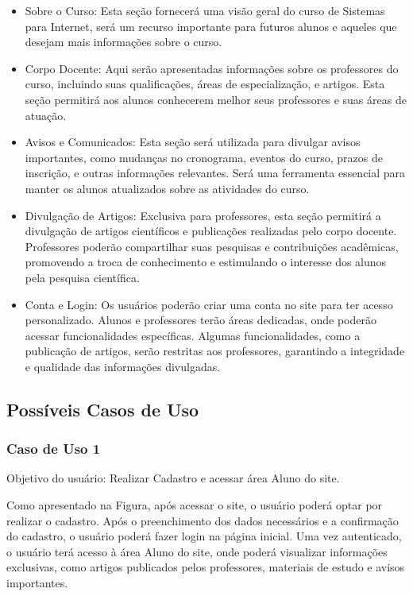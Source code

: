 \documentclass[a4paper,12pt]{report}
\begin{document}
\begin{itemize} 
    \item Sobre o Curso: Esta seção fornecerá uma visão geral do curso de Sistemas para Internet, será um recurso importante para futuros alunos e aqueles que desejam mais informações sobre o curso.
 
    \item Corpo Docente: Aqui serão apresentadas informações sobre os professores do curso, incluindo suas qualificações, áreas de especialização, e artigos. Esta seção permitirá aos alunos conhecerem melhor seus professores e suas áreas de atuação.
 
    \item Avisos e Comunicados: Esta seção será utilizada para divulgar avisos importantes, como mudanças no cronograma, eventos do curso, prazos de inscrição, e outras informações relevantes. Será uma ferramenta essencial para manter os alunos atualizados sobre as atividades do curso.
 
    \item Divulgação de Artigos: Exclusiva para professores, esta seção permitirá a divulgação de artigos científicos e publicações realizadas pelo corpo docente. Professores poderão compartilhar suas pesquisas e contribuições acadêmicas, promovendo a troca de conhecimento e estimulando o interesse dos alunos pela pesquisa científica.
 
    \item Conta e Login: Os usuários poderão criar uma conta no site para ter acesso personalizado. Alunos e professores terão áreas dedicadas, onde poderão acessar funcionalidades específicas. Algumas funcionalidades, como a publicação de artigos, serão restritas aos professores, garantindo a integridade e qualidade das informações divulgadas.
\end{itemize}

\subsection{Possíveis Casos de Uso}
 
\subsubsection{Caso de Uso 1}
 
Objetivo do usuário: Realizar Cadastro e acessar área Aluno do site.
 
Como apresentado na Figura, após acessar o site, o usuário poderá optar por realizar o cadastro. Após o preenchimento dos dados necessários e a confirmação do cadastro, o usuário poderá fazer login na página inicial. Uma vez autenticado, o usuário terá acesso à área Aluno do site, onde poderá visualizar informações exclusivas, como artigos publicados pelos professores, materiais de estudo e avisos importantes.
 
\end{document}
